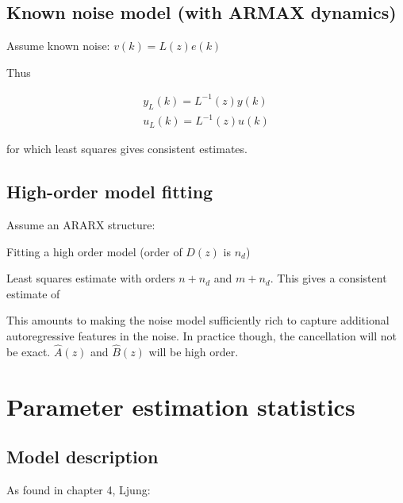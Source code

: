 \documentclass[10pt,a4paper]{scrartcl}
\begin{document}
\begin{multicols*}{2}
\subsection{Known noise model (with ARMAX dynamics)}

Assume known noise: $v(k)=L(z)e(k)$

Thus


\begin{align*}
y_L(k)=L^{-1}(z)y(k)\\
u_L(k)=L^{-1}(z)u(k)
\end{align*}


for which least squares gives consistent estimates.

\subsection{High-order model fitting}

Assume an ARARX structure:


Fitting a high order model (order of $D(z)$ is $n_d$)


Least squares estimate with orders $n+n_d$ and $m+n_d$. This gives a consistent estimate of 


This amounts to making the noise model sufficiently rich to capture additional autoregressive features in the noise. In practice though, the cancellation will not be exact. $\hat{A}(z)$ and $\hat{B}(z)$ will be high order.

\section{Parameter estimation statistics}

\subsection{Model description}

As found in chapter 4, Ljung:



\end{multicols*}
\end{document}
